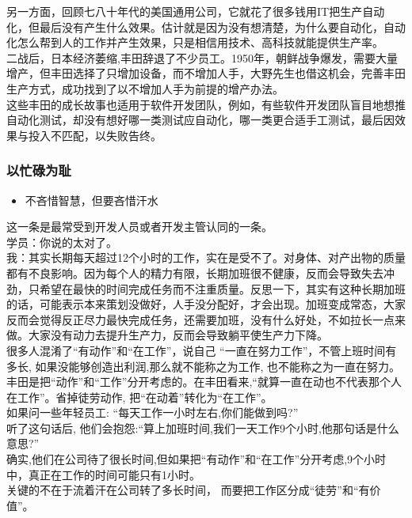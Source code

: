 另一方面，回顾七八十年代的美国通用公司，它就花了很多钱用IT把生产自动化，但最后没有产生什么效果。估计就是因为没有想清楚，为什么要自动化，自动化怎么帮到人的工作并产生效果，只是相信用技术、高科技就能提供生产率。\\
二战后，日本经济萎缩,丰田辞退了不少员工。1950年，朝鲜战争爆发，需要大量增产，但丰田选择了只增加设备，而不增加人手，大野先生也借这机会，完善丰田生产方式，成功找到了以不增加人手为前提的增产办法。\\
这些丰田的成长故事也适用于软件开发团队，例如，有些软件开发团队盲目地想推自动化测试，却没有想好哪一类测试应自动化，哪一类更合适手工测试，最后因效果与投入不匹配，以失败告终。

\hypertarget{ux4ee5ux5fd9ux788cux4e3aux803b}{%
\subsubsection{以忙碌为耻}\label{ux4ee5ux5fd9ux788cux4e3aux803b}}

\begin{itemize}
\tightlist
\item
  不吝惜智慧，但要吝惜汗水\\
\end{itemize}

这一条是最常受到开发人员或者开发主管认同的一条。\\
学员：你说的太对了。\\
我：其实长期每天超过12个小时的工作，实在是受不了。对身体、对产出物的质量都有不良影响。因为每个人的精力有限，长期加班很不健康，反而会导致失去冲劲，只希望在最快的时间完成任务而不注重质量。反思一下，其实有这种长期加班的话，可能表示本来策划没做好，人手没分配好，才会出现。加班变成常态，大家反而会觉得反正尽力最快完成任务，还需要加班，没有什么好处，不如拉长一点来做。大家没有动力去提升生产力，反而会导致躺平使生产力下降。\\
很多人混淆了``有动作''和``在工作''，说自己
``一直在努力工作''，不管上班时间有多长,
如果没能够创造出利润,那么就不能称之为工作, 也不能称之为一直在努力。\\
丰田是把``动作''和``工作''分开考虑的。在丰田看来,``就算一直在动也不代表那个人在工作''。省掉徒劳动作,
把``在动着''转化为``在工作''。\\
如果问一些年轻员工: ``每天工作一小时左右,你们能做到吗?''\\
听了这句话后,
他们会抱怨:``算上加班时间,我们一天工作9个小时,他那句话是什么意思?''\\
确实,他们在公司待了很长时间,但如果把``有动作''和``在工作''分开考虑,9个小时中，真正在工作的时间可能只有1小时。\\
关键的不在于流着汗在公司转了多长时间，
而要把工作区分成``徒劳''和``有价值''。

